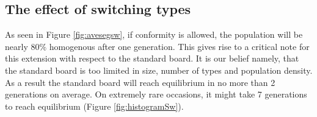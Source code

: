 \subsection{The effect of switching types}
As seen in Figure \ref{fig:avesegsw}, if conformity is allowed, the population will be nearly \(80\%\) homogenous after one generation. 
This gives rise to a critical note for this extension with respect to the standard board. It is our belief namely, that the standard board is too limited in size, number of types and population density. 
As a result the standard board will reach equilibrium in no more than 2 generations on average. On extremely rare occasions, it might take 7 generations to reach equilibrium (Figure  \ref{fig:histogramSw}). 

  